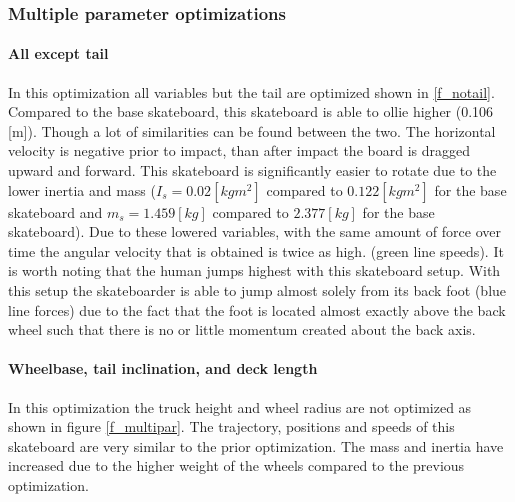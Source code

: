 \documentclass[default,iicol]{sn-jnl}
\begin{document}
\subsubsection{Multiple parameter optimizations}
\paragraph{All except tail}
\noindent In this optimization all variables but the tail are optimized shown in \ref{f_notail}. Compared to the base skateboard, this skateboard is able to ollie higher (0.106 [m]). Though a lot of similarities can be found between the two. The horizontal velocity is negative prior to impact, than after impact the board is dragged upward and forward. This skateboard is significantly easier to rotate due to the lower inertia and mass ($I_s = 0.02 [kg m^2]$ compared to $0.122 [kg m^2]$ for the base skateboard and $m_s = 1.459 [kg]$ compared to $2.377 [kg]$ for the base skateboard). Due to these lowered variables, with the same amount of force over time the angular velocity that is obtained is twice as high. (green line speeds). It is worth noting that the human jumps highest with this skateboard setup. 
With this setup the skateboarder is able to jump almost solely from its back foot (blue line forces) due to the fact that the foot is located almost exactly above the back wheel such that there is no or little momentum created about the back axis. 

\paragraph{Wheelbase, tail inclination, and deck length}
\noindent In this optimization the truck height and wheel radius are not optimized as shown in figure \ref{f_multipar}. The trajectory, positions and speeds of this skateboard are very similar to the prior optimization. The mass and inertia have increased due to the higher weight of the wheels compared to the previous optimization.
\end{document}
